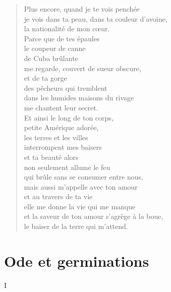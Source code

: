 \documentclass[11pt,a4paper]{book}
\begin{document}
\begin{verse}
Plus encore, quand je te vois penchée \\
je vois dans ta peau, dans ta couleur d'avoine, \\
la nationalité de mon c{\oe}ur. \\
Parce que de tes épaules \\
le coupeur de canne \\
de Cuba brûlante \\
me regarde, couvert de sueur obscure, \\
et de ta gorge \\
des pêcheurs qui tremblent \\
dans les humides maisons du rivage \\
me chantent leur secret. \\
Et ainsi le long de ton corps, \\
petite Amérique adorée, \\
les terres et les villes \\
interrompent mes baisers \\
et ta beauté alors \\
non seulement allume le feu \\
qui brûle sans se consumer entre nous, \\
mais aussi m'appelle avec ton amour \\
et au travers de ta vie \\
elle me donne la vie qui me manque \\
et la saveur de ton amour s'agrège à la boue, \\
le baiser de la terre qui m'attend.
\end{verse}

\cleardoublepage

\part{Ode et germinations}

\cleardoublepage

{\huge I} \\ \\
\end{document}
